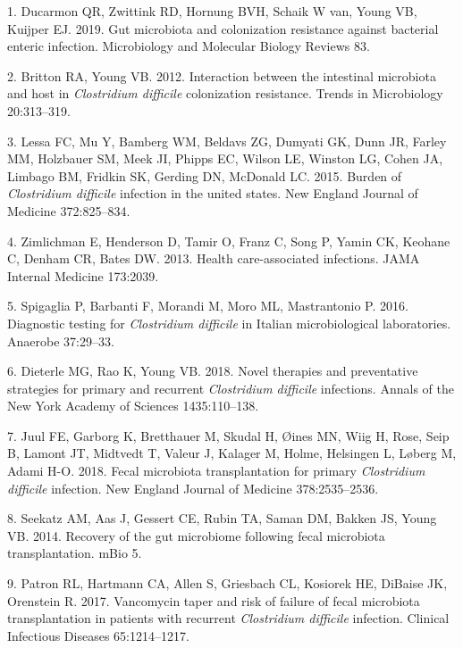 \documentclass[12pt,]{article}
\newlength{\cslhangindent}
\newenvironment{cslreferences}%
  {\setlength{\parindent}{0pt}%
  \everypar{\setlength{\hangindent}{\cslhangindent}}\ignorespaces}%
  {\par}
\begin{document}
\hypertarget{refs}{}
\begin{cslreferences}
\leavevmode\hypertarget{ref-ducarmon2019}{}%
1. Ducarmon QR, Zwittink RD, Hornung BVH, Schaik W van, Young VB,
Kuijper EJ. 2019. Gut microbiota and colonization resistance against
bacterial enteric infection. Microbiology and Molecular Biology Reviews
83.

\leavevmode\hypertarget{ref-britton2012}{}%
2. Britton RA, Young VB. 2012. Interaction between the intestinal
microbiota and host in \emph{Clostridium difficile} colonization
resistance. Trends in Microbiology 20:313--319.

\leavevmode\hypertarget{ref-lessa2015}{}%
3. Lessa FC, Mu Y, Bamberg WM, Beldavs ZG, Dumyati GK, Dunn JR, Farley
MM, Holzbauer SM, Meek JI, Phipps EC, Wilson LE, Winston LG, Cohen JA,
Limbago BM, Fridkin SK, Gerding DN, McDonald LC. 2015. Burden of
\emph{Clostridium difficile} infection in the united states. New England
Journal of Medicine 372:825--834.

\leavevmode\hypertarget{ref-zimlichman2013}{}%
4. Zimlichman E, Henderson D, Tamir O, Franz C, Song P, Yamin CK,
Keohane C, Denham CR, Bates DW. 2013. Health care-associated infections.
JAMA Internal Medicine 173:2039.

\leavevmode\hypertarget{ref-spigaglia2016}{}%
5. Spigaglia P, Barbanti F, Morandi M, Moro ML, Mastrantonio P. 2016.
Diagnostic testing for \emph{Clostridium difficile} in Italian
microbiological laboratories. Anaerobe 37:29--33.

\leavevmode\hypertarget{ref-dieterle2019}{}%
6. Dieterle MG, Rao K, Young VB. 2018. Novel therapies and preventative
strategies for primary and recurrent \emph{Clostridium difficile}
infections. Annals of the New York Academy of Sciences 1435:110--138.

\leavevmode\hypertarget{ref-juul2018}{}%
7. Juul FE, Garborg K, Bretthauer M, Skudal H, Øines MN, Wiig H, Rose,
Seip B, Lamont JT, Midtvedt T, Valeur J, Kalager M, Holme, Helsingen L,
Løberg M, Adami H-O. 2018. Fecal microbiota transplantation for primary
\emph{Clostridium difficile} infection. New England Journal of Medicine
378:2535--2536.

\leavevmode\hypertarget{ref-seekatz2014}{}%
8. Seekatz AM, Aas J, Gessert CE, Rubin TA, Saman DM, Bakken JS, Young
VB. 2014. Recovery of the gut microbiome following fecal microbiota
transplantation. mBio 5.

\leavevmode\hypertarget{ref-patron2017}{}%
9. Patron RL, Hartmann CA, Allen S, Griesbach CL, Kosiorek HE, DiBaise
JK, Orenstein R. 2017. Vancomycin taper and risk of failure of fecal
microbiota transplantation in patients with recurrent \emph{Clostridium
difficile} infection. Clinical Infectious Diseases 65:1214--1217.


\end{cslreferences}
\end{document}
